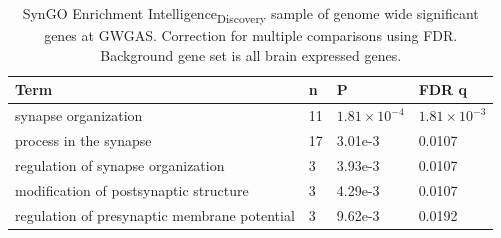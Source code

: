 \begin{table}[]
    \centering
    \begin{tabular}{llll}
    \toprule
      Term   & n & P & FDR q  \\
      \midrule
       synapse organization&	11&	$1.81\times10^{-4}$&	$1.81\times10^{-3}$\\
process in the synapse&	17&	3.01e-3&	0.0107\\
regulation of synapse organization&	3&	3.93e-3&	0.0107\\
modification of postsynaptic structure&	3	&4.29e-3	&0.0107\\
regulation of presynaptic membrane potential&	3&	9.62e-3&	0.0192  \\ 
\bottomrule
    \end{tabular}
    \caption{SynGO Enrichment Intelligence\textsubscript{Discovery} sample of genome wide significant genes at GWGAS. Correction for multiple comparisons using FDR. Background gene set is all brain expressed genes.}
    \label{tab:SynGO Enrichment UKBB intelligence significant genes. FDR}
\end{table}




   
